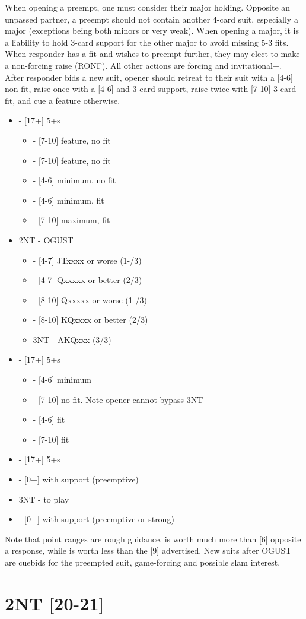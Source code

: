 \documentclass[12pt]{report}
\newcommand{\n}{\\}
\newcommand{\ul}[1]{\begin{itemize}#1\end{itemize}}
\newcommand{\li}{\item[~]}
\newcommand{\bidsection}[2]{\section{\texorpdfstring{#1}{#2}}}
\begin{document}
    When opening a preempt, one must consider their major holding.  Opposite an unpassed partner, a preempt should not contain another 4-card suit, especially a major (exceptions being both minors or very weak).  When opening a major, it is a liability to hold 3-card support for the other major to avoid missing 5-3 fits.  When responder has a fit and wishes to preempt further, they may elect to make a non-forcing raise (RONF).  All other actions are forcing and invitational+.\n
    
    After responder bids a new suit, opener should retreat to their suit with a [4-6] non-fit, raise once with a [4-6] and 3-card support, raise twice with [7-10] 3-card fit, and cue a feature otherwise.

    \ul {
        \li {} - [17+] 5+\sp{}s
        \ul {
            \li \cl3 - [7-10] feature, no fit
            \li \di3 - [7-10] feature, no fit
            \li \he3 - [4-6] minimum, no fit
            \li \sp3 - [4-6] minimum, fit
            \li \sp4 - [7-10] maximum, fit
        }
        \li 2NT - OGUST
        \ul {
            \li \cl3 - [4-7] JTxxxx or worse (1-/3)
            \li \di3 - [4-7] Qxxxxx or better (2/3)
            \li \sp3 - [8-10] Qxxxxx or worse (1-/3)
            \li \sp3 - [8-10] KQxxxx or better (2/3)
            \li 3NT - AKQxxx (3/3)
        }
        \li \cl3 - [17+] 5+\cl{}s
        \ul {
            \li \he3 - [4-6] minimum
            \li \sp3 - [7-10] no fit.  Note opener cannot bypass 3NT
            \li \cl4 - [4-6] fit
            \li \cl5 - [7-10] fit
        }
        \li \di3 - [17+] 5+\di{}s
        \li \he3 - [0+] with support (preemptive)
        \li 3NT - to play
        \li \he4 - [0+] with support (preemptive or strong)
    }

    Note that point ranges are rough guidance.  is worth much more than [6] opposite a  response, while  is worth less than the [9] advertised.  New suits after OGUST are cuebids for the preempted suit, game-forcing and possible slam interest.
\newpage

\bidsection{2NT [20-21]}{2NT [20-21]} \label{2:9}
\end{document}
